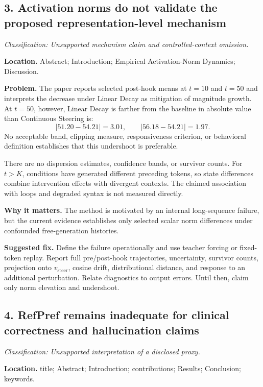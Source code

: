 \documentclass[11pt]{article}
\newcommand{\findinglabel}[1]{\textbf{#1}}
\newcommand{\classification}[1]{\textit{Classification: #1.}}
\begin{document}
\subsection*{3. Activation norms do not validate the proposed representation-level mechanism}

\classification{Unsupported mechanism claim and controlled-context omission}

\findinglabel{Location.} Abstract; Introduction; Empirical Activation-Norm Dynamics; Discussion.

\findinglabel{Problem.} The paper reports selected post-hook means at $t=10$ and $t=50$ and interprets the decrease under Linear Decay as mitigation of magnitude growth.  At $t=50$, however, Linear Decay is farther from the baseline in absolute value than Continuous Steering is:
\[
|51.20-54.21|=3.01,
\qquad
|56.18-54.21|=1.97.
\]
No acceptable band, clipping measure, responsiveness criterion, or behavioral definition establishes that this undershoot is preferable.

There are no dispersion estimates, confidence bands, or survivor counts.  For $t>K$, conditions have generated different preceding tokens, so state differences combine intervention effects with divergent contexts.  The claimed association with loops and degraded syntax is not measured directly.

\findinglabel{Why it matters.} The method is motivated by an internal long-sequence failure, but the current evidence establishes only selected scalar norm differences under confounded free-generation histories.

\findinglabel{Suggested fix.} Define the failure operationally and use teacher forcing or fixed-token replay.  Report full pre/post-hook trajectories, uncertainty, survivor counts, projection onto $v_{\text{steer}}$, cosine drift, distributional distance, and response to an additional perturbation.  Relate diagnostics to output errors.  Until then, claim only norm elevation and undershoot.

\subsection*{4. RefPref remains inadequate for clinical correctness and hallucination claims}

\classification{Unsupported interpretation of a disclosed proxy}

\findinglabel{Location.} title; Abstract; Introduction; contributions; Results; Conclusion; keywords.
\end{document}
